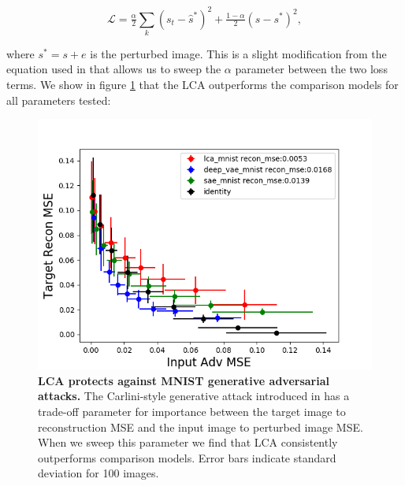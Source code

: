 \begin{equation}\label{eq:ch4_carlini_targeted_recon}
    \mathcal{L} = \tfrac{\alpha}{2} \sum_{k}\left(s_{t} - \hat{s}^{*}\right)^{2} + \tfrac{1-\alpha}{2}\left(s - s^{*}\right)^{2},
\end{equation}

\noindent where $s^{*}=s+e$ is the perturbed image. This is a slight modification from the equation used in \parencite{kos2018adversarial} that allows us to sweep the $\alpha$ parameter between the two loss terms. We show in figure \ref{fig:ch4_kos_generative_attack} that the LCA outperforms the comparison models for all parameters tested:

\begin{figure}[h]
    \begin{center}
    \centerline{\includegraphics[width=\columnwidth]{figures/recon_mult_tradeoff.png}}
    \end{center}
    \caption{\textbf{LCA protects against MNIST generative adversarial attacks.} The Carlini-style generative attack introduced in \parencite{kos2018adversarial} has a trade-off parameter for importance between the target image to reconstruction MSE and the input image to perturbed image MSE. When we sweep this parameter we find that LCA consistently outperforms comparison models. Error bars indicate standard deviation for 100 images.}
    \label{fig:ch4_kos_generative_attack}
\end{figure}



